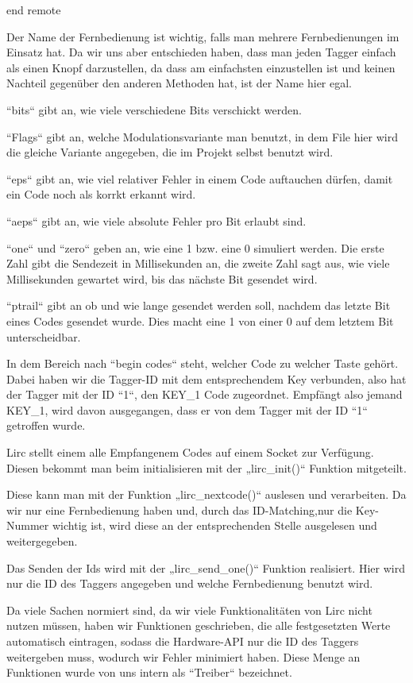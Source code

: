 end remote

Der Name der Fernbedienung ist wichtig, falls man mehrere Fernbedienungen im Einsatz hat. Da wir uns aber entschieden haben,
dass man jeden Tagger einfach als einen Knopf darzustellen, da dass am einfachsten einzustellen ist und keinen Nachteil
gegenüber den anderen Methoden hat, ist der Name hier egal.

“bits“ gibt an, wie viele verschiedene Bits verschickt werden.



“Flags“ gibt an, welche Modulationsvariante man benutzt, in dem File hier wird die gleiche Variante angegeben,
die im Projekt selbst benutzt wird.



“eps“ gibt an, wie viel relativer Fehler in einem Code auftauchen dürfen, damit ein Code noch als korrkt erkannt wird.



“aeps“ gibt an, wie viele absolute Fehler pro Bit erlaubt sind.

“one“ und “zero“ geben an, wie eine 1 bzw. eine 0 simuliert werden.
Die erste Zahl gibt die Sendezeit in Millisekunden an, die zweite Zahl sagt aus, wie viele Millisekunden gewartet wird,
bis das nächste Bit gesendet wird.



“ptrail“ gibt an ob und wie lange gesendet werden soll, nachdem das letzte Bit eines Codes gesendet wurde. 
Dies macht eine 1 von einer 0 auf dem letztem Bit unterscheidbar.



In dem Bereich nach “begin codes“ steht, welcher Code zu welcher Taste gehört. Dabei haben wir die Tagger-ID mit dem
entsprechendem Key verbunden, also hat der Tagger mit der ID “1“, den KEY_1 Code zugeordnet. Empfängt also
jemand KEY_1, wird davon ausgegangen, dass er von dem Tagger mit der ID “1“ getroffen wurde.



Lirc stellt einem alle Empfangenem Codes auf einem Socket zur Verfügung. Diesen bekommt man beim initialisieren mit der
 „lirc_init()“ Funktion mitgeteilt.


Diese kann man mit der Funktion „lirc_nextcode()“ auslesen und verarbeiten. Da wir nur eine Fernbedienung haben
und, durch das ID-Matching,nur die Key-Nummer wichtig ist, wird diese an der entsprechenden Stelle ausgelesen und weitergegeben.



Das Senden der Ids wird mit der „lirc_send_one()“ Funktion realisiert. Hier wird nur die ID des Taggers angegeben
und welche Fernbedienung benutzt wird.


Da viele Sachen normiert sind, da wir viele Funktionalitäten von Lirc nicht nutzen müssen, haben wir Funktionen geschrieben,
die alle festgesetzten Werte automatisch eintragen, sodass die Hardware-API nur die ID des Taggers weitergeben muss,
wodurch wir Fehler minimiert haben. Diese Menge an Funktionen wurde von uns intern als “Treiber“ bezeichnet.
